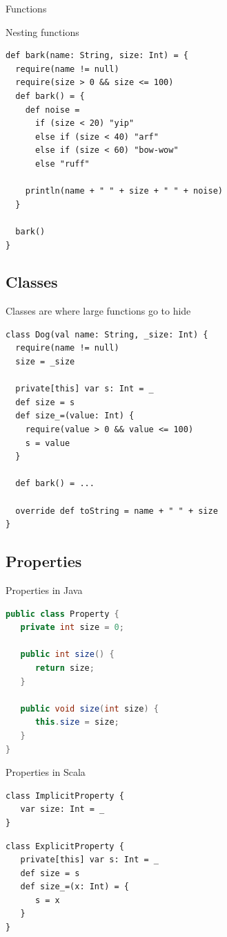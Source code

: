 \begin{frame}[fragile]{Functions}
\begin{exampleblock}{Nesting functions}
\begin{lstlisting}
def bark(name: String, size: Int) = {
  require(name != null)
  require(size > 0 && size <= 100)
  def bark() = {
    def noise =
      if (size < 20) "yip"
      else if (size < 40) "arf"
      else if (size < 60) "bow-wow"
      else "ruff"
        
    println(name + " " + size + " " + noise)
  }
  
  bark()
}
\end{lstlisting}
\end{exampleblock}
\end{frame}

\subsection{Classes}
\begin{frame}[fragile]{Classes are where large functions go to hide}
\begin{lstlisting}
class Dog(val name: String, _size: Int) {
  require(name != null)
  size = _size

  private[this] var s: Int = _
  def size = s
  def size_=(value: Int) {
    require(value > 0 && value <= 100)
    s = value
  }

  def bark() = ...
  
  override def toString = name + " " + size
}
\end{lstlisting}
\end{frame}

\subsection{Properties}
\begin{frame}[fragile]{Properties in Java}
\begin{lstlisting}[language=java]
public class Property {
   private int size = 0;

   public int size() {
      return size;
   }

   public void size(int size) {
      this.size = size;
   }
}
\end{lstlisting}
\end{frame}

\begin{frame}[fragile]{Properties in Scala}
\begin{lstlisting}
class ImplicitProperty {
   var size: Int = _
}
\end{lstlisting}
\pause
\begin{lstlisting}
class ExplicitProperty {
   private[this] var s: Int = _
   def size = s	
   def size_=(x: Int) = {
      s = x
   }
}
\end{lstlisting}
\end{frame}

